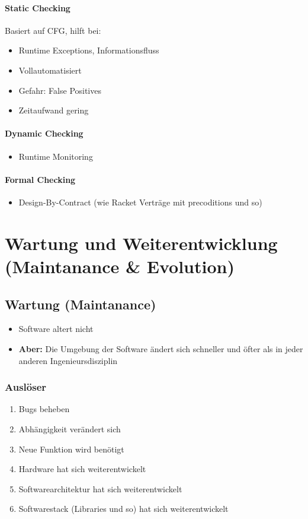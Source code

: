 \documentclass[
    ngerman,
    color=3b,
    summary,
    boxarc,
    main,
]{rubos-tuda-template}
\begin{document}
\paragraph{Static Checking}
Basiert auf CFG, hilft bei:
\begin{itemize}
    \item Runtime Exceptions, Informationsfluss
    \item Vollautomatisiert
    \item Gefahr: False Positives
    \item Zeitaufwand gering
\end{itemize}
\vspace*{-1ex}
\paragraph{Dynamic Checking}\begin{itemize}
    \item Runtime Monitoring
\end{itemize}
\vspace*{-1ex}
\paragraph{Formal Checking}\begin{itemize}
    \item Design-By-Contract (wie Racket Verträge mit precoditions und so)
\end{itemize}

\clearpage
\section{Wartung und Weiterentwicklung (Maintanance \& Evolution)}
\subsection{Wartung (Maintanance)}
\begin{itemize}
    \item Software altert nicht
    \item \textbf{Aber:} Die Umgebung der Software ändert sich schneller und öfter als in jeder anderen Ingenieursdisziplin
\end{itemize}
\subsubsection{Auslöser}
\begin{enumerate}
    \item Bugs beheben
    \item Abhängigkeit verändert sich
    \item Neue Funktion wird benötigt
    \item Hardware hat sich weiterentwickelt
    \item Softwarearchitektur hat sich weiterentwickelt
    \item Softwarestack (Libraries und so) hat sich weiterentwickelt
\end{enumerate}
\end{document}
